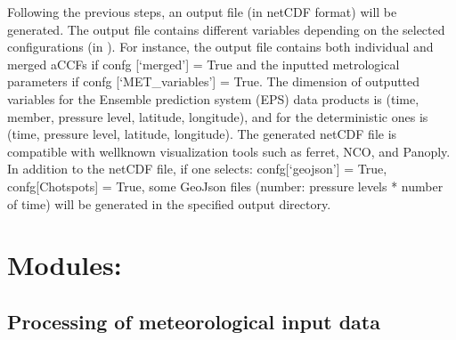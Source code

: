 \documentclass[a4paper,11pt,english]{sphinxmanual}
\begin{document}
\begin{sphinxVerbatim}[commandchars=\\\{\}]
\end{sphinxVerbatim}

Following the previous steps, an output file (in netCDF format) will be generated. The output file contains different variables depending on the selected configurations (in ).
For instance, the output file contains both individual and merged aCCFs  if confg {[}‘merged’{]} = True and the inputted metrological parameters if confg {[}‘MET\_variables’{]} = True. The dimension of outputted variables for the Ensemble prediction system (EPS) data products is (time, member, pressure level, latitude, longitude), and for the deterministic ones is (time, pressure level, latitude, longitude).
The generated netCDF file is compatible with well\sphinxhyphen{}known visualization tools such as ferret, NCO, and Panoply.
In addition to the netCDF file, if one selects: confg{[}‘geojson’{]} = True, confg{[}Chotspots{]} = True, some GeoJson files (number: pressure levels * number of time) will be generated in the specified output directory.


\chapter{Modules:}
\label{\detokenize{index:modules}}

\section{Processing of meteorological input data}
\label{\detokenize{modules:module-envlib.extract_data}}\label{\detokenize{modules:processing-of-meteorological-input-data}}\label{\detokenize{modules::doc}}
\end{document}
